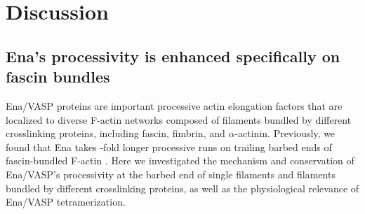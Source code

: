 \section{Discussion}\label{ch02-discussion}

\subsection{Ena's processivity is enhanced specifically on fascin bundles}\label{ena-discuss-specific-fascin}

Ena/VASP proteins are important processive actin elongation factors that are localized to diverse F-actin networks composed of filaments bundled by different crosslinking proteins, including fascin, fimbrin, and $\alpha$-actinin. Previously, we found that Ena takes -fold longer processive runs on trailing barbed ends of fascin-bundled F-actin \citep{winkelman_ena/vasp_2014}. Here we investigated the mechanism and conservation of Ena/VASP's processivity at the barbed end of single filaments and filaments bundled by different crosslinking proteins, as well as the physiological relevance of Ena/VASP tetramerization.

